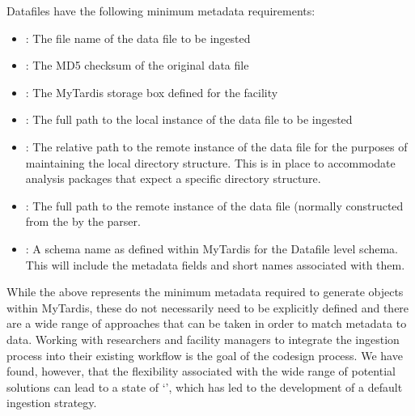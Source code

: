 \documentclass[letterpaper,10pt,english]{sphinxmanual}
\begin{document}
\sphinxAtStartPar
Datafiles have the following minimum metadata requirements:
\begin{itemize}
\item {}
\sphinxAtStartPar
{}: The file name of the data file to be ingested

\item {}
\sphinxAtStartPar
{}: The MD5 checksum of the original data file

\item {}
\sphinxAtStartPar
{}: The MyTardis storage box defined for the facility

\item {}
\sphinxAtStartPar
{}: The full path to the local instance of the data file to be ingested

\item {}
\sphinxAtStartPar
{}: The relative path to the remote instance of the data file for the purposes of maintaining the local directory structure. This is in place to accommodate analysis packages that expect a specific directory structure.

\item {}
\sphinxAtStartPar
{}: The full path to the remote instance of the data file (normally constructed from the  by the parser.

\item {}
\sphinxAtStartPar
{}: A schema name as defined within MyTardis for the Datafile level schema. This will include the metadata fields and short names associated with them.

\end{itemize}

\sphinxAtStartPar
While the above represents the minimum metadata required to generate objects within MyTardis, these do not necessarily need to be explicitly defined and there are a wide range of approaches that can be taken in order to match metadata to data. Working with researchers and facility managers to integrate the ingestion process into their existing workflow is the goal of the co\sphinxhyphen{}design process. We have found, however, that the flexibility associated with the wide range of potential solutions can lead to a state of ‘’, which has led to the development of a default ingestion strategy.
\end{document}

